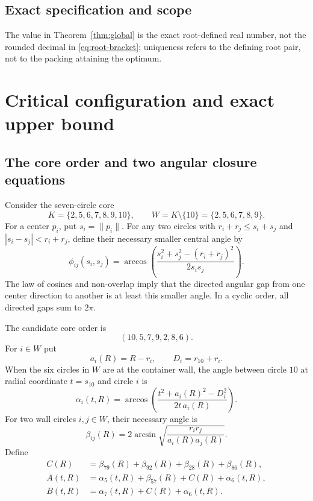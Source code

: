 \documentclass[11pt,a4paper]{article}
\theoremstyle{remark}
\newcommand{\norm}[1]{\lVert #1\rVert}
\begin{document}
\subsection{Exact specification and scope}

The value in Theorem~\ref{thm:global} is the exact root-defined real number,
not the rounded decimal in \eqref{eq:root-bracket}; uniqueness refers to the
defining root pair, not to the packing attaining the optimum.

\section{Critical configuration and exact upper bound}
\label{sec:critical}

\subsection{The core order and two angular closure equations}

Consider the seven-circle core
\[
  K=\{2,5,6,7,8,9,10\},\qquad
  W=K\setminus\{10\}=\{2,5,6,7,8,9\}.
\]
For a center $p_i$, put $s_i=\norm{p_i}$.  For any two circles with
$r_i+r_j\le s_i+s_j$ and $|s_i-s_j|<r_i+r_j$, define their necessary
smaller central angle by
\begin{equation}
  \phi_{ij}(s_i,s_j)=
  \arccos\!\left(
    \frac{s_i^2+s_j^2-(r_i+r_j)^2}{2s_is_j}
  \right).
  \label{eq:phi}
\end{equation}
The law of cosines and non-overlap imply that the directed angular gap from
one center direction to another is at least this smaller angle.  In a
cyclic order, all directed gaps sum to $2\pi$.

The candidate core order is
\[
  (10,5,7,9,2,8,6).
\]
For $i\in W$ put
\[
 a_i(R)=R-r_i,\qquad D_i=r_{10}+r_i.
\]
When the six circles in $W$ are at the container wall, the angle between
circle $10$ at radial coordinate $t=s_{10}$ and circle $i$ is
\begin{equation}
  \alpha_i(t,R)=
  \arccos\!\left(
    \frac{t^2+a_i(R)^2-D_i^2}{2t\,a_i(R)}
  \right).
  \label{eq:alpha}
\end{equation}
For two wall circles $i,j\in W$, their necessary angle is
\begin{equation}
  \beta_{ij}(R)=
  2\arcsin\sqrt{\frac{r_ir_j}{a_i(R)a_j(R)}}.
  \label{eq:beta}
\end{equation}
Define
\begin{align}
 C(R)&=\beta_{79}(R)+\beta_{92}(R)+\beta_{28}(R)+\beta_{86}(R),\\
 A(t,R)&=\alpha_5(t,R)+\beta_{57}(R)+C(R)+\alpha_6(t,R),\\
 B(t,R)&=\alpha_7(t,R)+C(R)+\alpha_6(t,R).
 \label{eq:AB}
\end{align}
\end{document}
